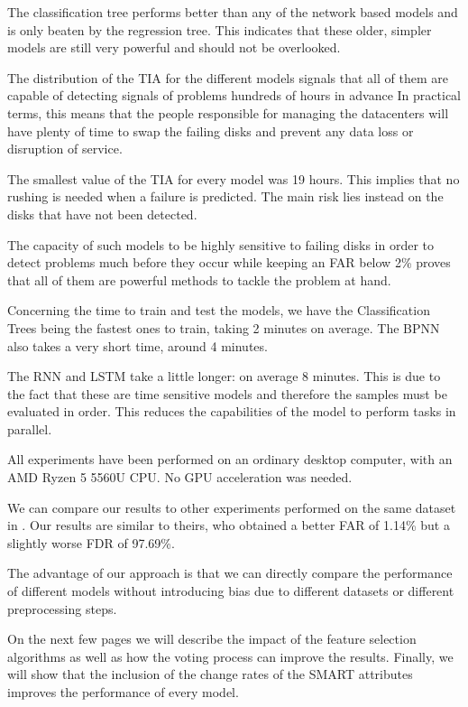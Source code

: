 The classification tree performs better than any of the network based models and is only beaten by the regression tree.
This indicates that these older, simpler models are still very powerful and should not be overlooked.

The distribution of the TIA for the different models signals that all of them are capable of detecting signals of problems hundreds of hours in advance
In practical terms, this means that the people responsible for managing the datacenters will have plenty of time to swap the failing disks and prevent any data loss or disruption of service.

The smallest value of the TIA for every model was 19 hours.
This implies that no rushing is needed when a failure is predicted.
The main risk lies instead on the disks that have not been detected.

The capacity of such models to be highly sensitive to failing disks in order to detect problems much before they occur while keeping an FAR below 2\% proves that all of them are powerful methods to tackle the problem at hand.

Concerning the time to train and test the models, we have the Classification Trees being the fastest ones to train, taking 2 minutes on average.
The BPNN also takes a very short time, around 4 minutes.

The RNN and LSTM take a little longer: on average 8 minutes.
This is due to the fact that these are time sensitive models and therefore the samples must be evaluated in order.
This reduces the capabilities of the model to perform tasks in parallel.

All experiments have been performed on an ordinary desktop computer, with an AMD Ryzen 5 5560U CPU.
No GPU acceleration was needed.

We can compare our results to other experiments performed on the same dataset in \cite{Zhu13}.
Our results are similar to theirs, who obtained a better FAR of 1.14\% but a slightly worse FDR of 97.69\%.

The advantage of our approach is that we can directly compare the performance of different models without introducing bias due to different datasets or different preprocessing steps.

On the next few pages we will describe the impact of the feature selection algorithms as well as how the voting process can improve the results.
Finally, we will show that the inclusion of the change rates of the SMART attributes improves the performance of every model.

